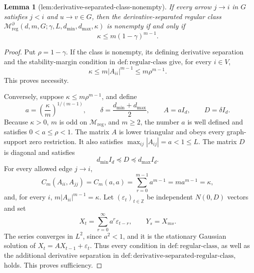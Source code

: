 \documentclass{article}
\newtheorem{lemma}{Lemma}
\begin{document}
\begin{lemma}[lem:derivative-separated-class-nonempty]\label{lem:derivative-separated-class-nonempty}
If every arrow \(j\to i\) in \(G\) satisfies \(j<i\) and \(u\to v\in G\), then the derivative-separated regular class \(\mathcal M_{\mathrm{reg}}^{\partial}(d,m,G;\gamma,L,d_{\min},d_{\max},\kappa)\) is nonempty if and only if
\[
 \kappa\le m(1-\gamma)^{m-1}.
\]
\end{lemma}
\begin{proof}
Put \(\rho=1-\gamma\).  If the class is nonempty, its defining derivative separation and the stability-margin condition in \(\mathrm{def{:}regular\mbox{-}class}\) give, for every \(i\in V\),
\[
 \kappa\le m|A_{ii}|^{m-1}\le m\rho^{m-1}.
\]
This proves necessity.

Conversely, suppose \(\kappa\le m\rho^{m-1}\), and define
\[
 a=\left(\frac{\kappa}{m}\right)^{1/(m-1)},
 \qquad
 \delta=\frac{d_{\min}+d_{\max}}{2},
 \qquad
 A=aI_d,
 \qquad
 D=\delta I_d.
\]
Because \(\kappa>0\), \(m\) is odd on \(\mathcal M_{\mathrm{reg}}\), and \(m\ge2\), the number \(a\) is well defined and satisfies \(0<a\le\rho<1\).  The matrix \(A\) is lower triangular and obeys every graph-support zero restriction.  It also satisfies \(\max_{ij}|A_{ij}|=a<1\le L\).  The matrix \(D\) is diagonal and satisfies
\[
 d_{\min}I_d\preceq D\preceq d_{\max}I_d.
\]
For every allowed edge \(j\to i\),
\[
 C_m(A_{ii},A_{jj})=C_m(a,a)
 =\sum_{r=0}^{m-1}a^{m-1}
 =ma^{m-1}=\kappa,
\]
and, for every \(i\), \(m|A_{ii}|^{m-1}=\kappa\).  Let \((\varepsilon_t)_{t\in\mathbb Z}\) be independent \(N(0,D)\) vectors and set
\[
 X_t=\sum_{r=0}^{\infty}a^r\varepsilon_{t-r},
 \qquad Y_s=X_{ms}.
\]
The series converges in \(L^2\), since \(a^2<1\), and it is the stationary Gaussian solution of \(X_t=AX_{t-1}+\varepsilon_t\).  Thus every condition in \(\mathrm{def{:}regular\mbox{-}class}\), as well as the additional derivative separation in \(\mathrm{def{:}derivative\mbox{-}separated\mbox{-}regular\mbox{-}class}\), holds.  This proves sufficiency.
\end{proof}
\end{document}
